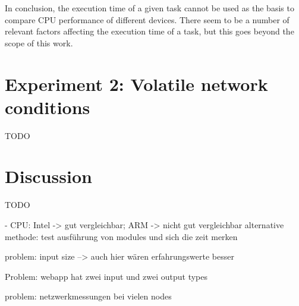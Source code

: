 In conclusion, the execution time of a given task cannot be used as the basis to compare CPU performance of different devices.
There seem to be a number of relevant factors affecting the execution time of a task, but this goes beyond the scope of this work.


\section{Experiment 2: Volatile network conditions}

TODO

\section{Discussion}

TODO

- CPU: Intel -> gut vergleichbar; ARM -> nicht gut vergleichbar
alternative methode: test ausführung von modules und sich die zeit merken

problem: input size --> auch hier wären erfahrungswerte besser

Problem: webapp hat zwei input und zwei output types

problem: netzwerkmessungen bei vielen nodes